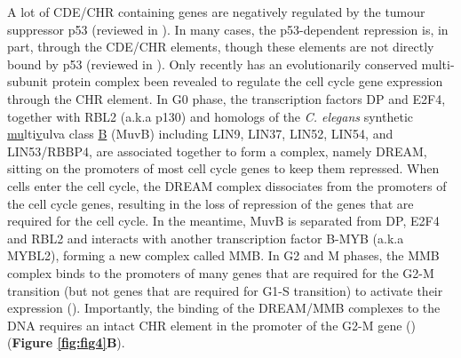 A lot of CDE/CHR containing genes are negatively regulated by the tumour suppressor p53 (reviewed in \cite{müller2010the}). In many cases, the p53-dependent repression is, in part, through the CDE/CHR elements, though these elements are not directly bound by p53 (reviewed in \cite{müller2010the}). Only recently has an evolutionarily conserved multi-subunit protein complex been revealed to regulate the cell cycle gene expression through the CHR element. In G0 phase, the transcription factors DP and E2F4, together with RBL2 (a.k.a p130) and homologs of the \textit{C. elegans} synthetic \underline{mu}lti\underline{v}ulva class \underline{B} (MuvB) including LIN9, LIN37, LIN52, LIN54, and LIN53/RBBP4, are associated together to form a complex, namely DREAM, sitting on the promoters of most cell cycle genes to keep them repressed. When cells enter the cell cycle, the DREAM complex dissociates from the promoters of the cell cycle genes, resulting in the loss of repression of the genes that are required for the cell cycle. In the meantime, MuvB is separated from DP, E2F4 and RBL2 and interacts with another transcription factor B-MYB (a.k.a MYBL2), forming a new complex called MMB. In G2 and M phases, the MMB complex binds to the promoters of many genes that are required for the G2-M transition (but not genes that are required for G1-S transition) to activate their expression (\cite{litovchick2007evolutionarily,müller2012the,sadasivam2012the}). Importantly, the binding of the DREAM/MMB complexes to the DNA requires an intact CHR element in the promoter of the G2-M gene (\cite{müller2012the}) (\textbf{Figure \ref{fig:fig4}B}).

